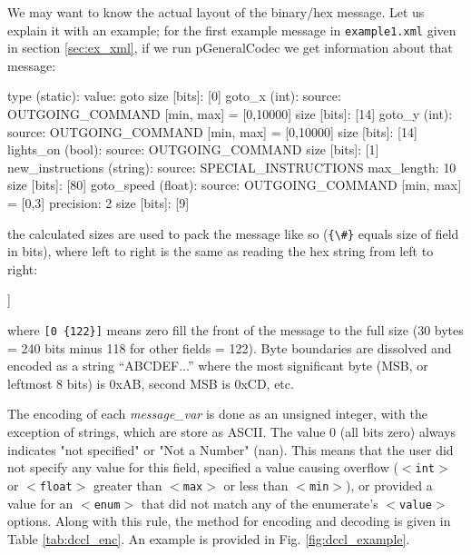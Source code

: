 \documentclass[11pt, letterpaper, oneside]{memoir}
\newcommand{\xmltag}[1]{\texttt{$<$#1$>$}}
\begin{document}
\begin{itemize}
We may want to know the actual layout of the binary/hex message. Let us explain it with an example; for the first example message in \verb|example1.xml| given in section \ref{sec:ex_xml}, if we run pGeneralCodec we get information about that message:
\begin{small}
\begin{boxedverbatim}
        type (static):
                value: {goto}
                size [bits]: [0]
        goto_x (int):
                source: {OUTGOING_COMMAND}
                [min, max] = [0,10000]
                size [bits]: [14]
        goto_y (int):
                source: {OUTGOING_COMMAND}
                [min, max] = [0,10000]
                size [bits]: [14]
        lights_on (bool):
                source: {OUTGOING_COMMAND}
                size [bits]: [1]
        new_instructions (string):
                source: {SPECIAL_INSTRUCTIONS}
                max_length: {10}
                size [bits]: [80]
        goto_speed (float):
                source: {OUTGOING_COMMAND}
                [min, max] = [0,3]
                precision: {2}
                size [bits]: [9]
\end{boxedverbatim}
\resetbvlinenumber
\end{small}
the calculated sizes are used to pack the message like so (\verb|{\#}| equals size of field in bits), where left to right is the same as reading the hex string from left to right:
\begin{small}
\begin{boxedverbatim}
[[0 {122}][goto_x {14}][goto_y {14}][lights_on {1}][new_instructions {80}][goto_speed {9}]]
\end{boxedverbatim}
\resetbvlinenumber
\end{small}
where \verb|[0 {122}]| means zero fill the front of the message to the full size (30 bytes = 240 bits minus 118 for other fields = 122). Byte boundaries are dissolved and encoded as a string ``ABCDEF...'' where the most significant byte (MSB, or leftmost 8 bits) is 0xAB, second MSB is 0xCD, etc. 


The encoding of each \textit{message\_var} is done as an unsigned integer, with the exception of strings, which are store as ASCII. The value 0 (all bits zero) always indicates "not specified" or "Not a Number" (nan). This means that the user did not specify any value for this field, specified a value causing overflow (\xmltag{int} or \xmltag{float} greater than \xmltag{max} or less than \xmltag{min}), or provided a value for an \xmltag{enum} that did not match any of the enumerate's \xmltag{value} options. Along with this rule, the method for encoding and decoding is given in Table \ref{tab:dccl_enc}. An example is provided in Fig. \ref{fig:dccl_example}. 


\end{itemize}
\end{document}
